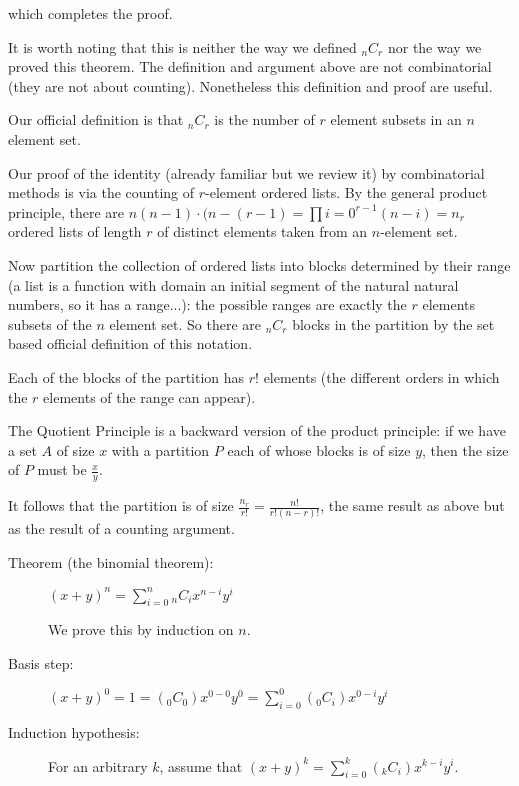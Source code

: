 \documentclass[12pt]{article}
\begin{document}
\begin{description}
\begin{description}
which completes the proof.


\end{description}

It is worth noting that this is neither the way we defined $_nC_r$ nor the way we proved this theorem.  The definition and argument above are not combinatorial (they are not about counting).  Nonetheless this definition and proof are useful.

Our official definition is that $_nC_r$ is the number of $r$ element subsets in an $n$ element set.

Our proof of the identity (already familiar but we review it) by combinatorial methods is via the counting of $r$-element ordered lists.  By the general product principle, there are $n(n-1)\cdot(n-(r-1) = \prod{i=0}^{r-1}(n-i) = n_r$ ordered lists of length $r$ of distinct elements taken from an $n$-element set.

Now partition the collection of ordered lists into blocks determined by their range (a list is a function with domain an initial segment of the natural natural numbers, so it has a range...):  the possible ranges are exactly the $r$ elements subsets of the $n$ element set.  So there are $_nC_r$ blocks in the partition by the set based official definition of this notation.

Each of the blocks of the partition has $r!$ elements (the different orders in which the $r$ elements of the range can appear).

The Quotient Principle is a backward version of the product principle:  if we have a set $A$ of size $x$ with a partition $P$ each of whose blocks is of size $y$, then the size of $P$ must be $\frac xy$.

It follows that the partition is of size $\frac{n_r}{r!} = \frac{n!}{r!(n-r)!}$, the same result as above but as the result of a counting argument.

\begin{description}

\item[Theorem (the binomial theorem):]  $(x+y)^n = \sum_{i=0}^n {_nC_i}x^{n-i}y^i$

We prove this by induction on $n$.

\item[Basis step:]  $(x+y)^0 = 1 = (_0C_0)x^{0-0}y^0 = \sum_{i=0}^0(_0C_i)x^{0-i}y^i$

\item[Induction hypothesis:]  For an arbitrary $k$, assume that $(x+y)^k = \sum_{i=0}^k(_kC_i)x^{k-i}y^i$.


\end{description}
\end{description}
\end{document}
